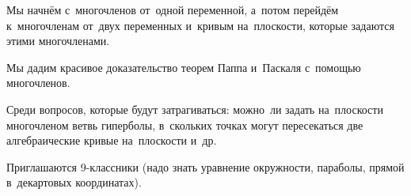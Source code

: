 



Мы начнём с~многочленов от~одной переменной, а~потом перейдём к~многочленам
от~двух переменных и~кривым на~плоскости, которые задаются этими многочленами.

Мы дадим красивое доказательство теорем Паппа и~Паскаля с~помощью многочленов.

Среди вопросов, которые будут затрагиваться: можно~ли задать на~плоскости
многочленом ветвь гиперболы, в~скольких точках могут пересекаться две
алгебраические кривые на~плоскости и~др.

Приглашаются 9-классники (надо знать уравнение окружности, параболы, прямой
в~декартовых координатах).

